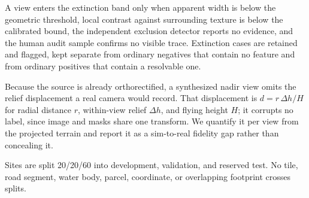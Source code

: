 A view enters the extinction band only when apparent width is below the
geometric threshold, local contrast against surrounding texture is below the
calibrated bound, the independent exclusion detector reports no evidence, and
the human audit sample confirms no visible trace. Extinction cases are retained
and flagged, kept separate from ordinary negatives that contain no feature and
from ordinary positives that contain a resolvable one.

Because the source is already orthorectified, a synthesized nadir view omits the
relief displacement a real camera would record. That displacement is
$d = r\,\Delta h / H$ for radial distance $r$, within-view relief $\Delta h$, and
flying height $H$; it corrupts no label, since image and masks share one
transform. We quantify it per view from the projected terrain and report it as a
sim-to-real fidelity gap rather than concealing it. 

Sites are split 20/20/60 into development, validation, and reserved test. No
tile, road segment, water body, parcel, coordinate, or overlapping footprint
crosses splits. 
